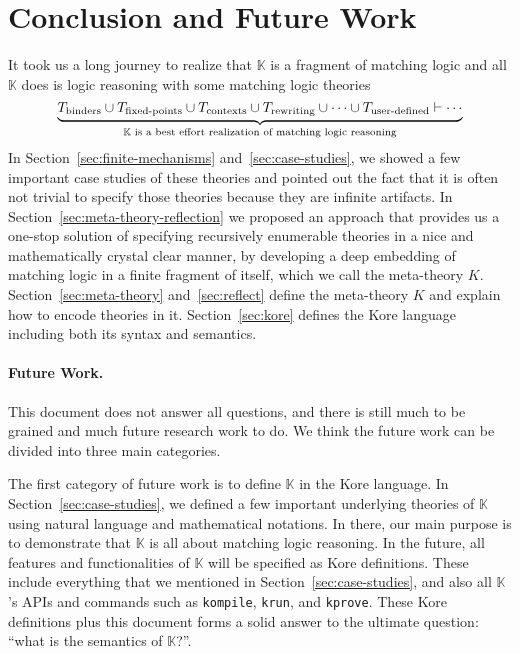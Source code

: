 \documentclass[UTF8,11pt]{article}
\theoremstyle{plain}
\theoremstyle{definition}
\theoremstyle{remark}
\newcommand{\K}{\mbox{$\mathbb{K}$}\xspace}
\begin{document}

\section{Conclusion and Future Work}
It took us a long journey to realize that \K is a fragment of matching logic 
and all \K does is logic reasoning with some matching logic theories
$$
\underbrace{T_\textrm{binders} \cup
T_\textrm{fixed-points} \cup 
T_\textrm{contexts} \cup 
T_\textrm{rewriting} \cup 
\cdots \cup 
T_\textrm{user-defined} \vdash \cdots}_
\text{\K is a best effort realization of matching logic reasoning}
$$
In Section~\ref{sec:finite-mechanisms} and~\ref{sec:case-studies}, we showed a 
few important case studies of these theories and pointed out the fact that
it is often not trivial to specify those theories because they are infinite 
artifacts. 
In Section~\ref{sec:meta-theory-reflection} we proposed an approach that 
provides us a one-stop solution of specifying recursively enumerable theories 
in a nice and mathematically crystal clear manner, by developing a deep 
embedding of matching logic in a finite fragment of itself, which we call the 
meta-theory $K$.
Section~\ref{sec:meta-theory} and~\ref{sec:reflect} define the meta-theory $K$ 
and explain how to encode theories in it.
Section~\ref{sec:kore} defines the Kore language including both its syntax and 
semantics.

\paragraph{Future Work.}
This document does not answer all questions, and there is still much to be 
grained and much future research work to do.
We think the future work can be divided into three main categories.

The first category of future work is to define \K in the Kore language.
In Section~\ref{sec:case-studies}, we defined a few important underlying 
theories of \K using natural language and mathematical notations.
In there, our main purpose is to demonstrate that \K is all about matching 
logic reasoning.
In the future, all features and functionalities of \K will be specified as 
Kore definitions.
These include everything that we mentioned in Section~\ref{sec:case-studies}, 
and also all \K's APIs and commands such as 
\texttt{kompile}, \texttt{krun}, and \texttt{kprove}.
These Kore definitions plus this document forms a solid answer to the ultimate 
question: ``what is the semantics of \K?''.
\end{document}
